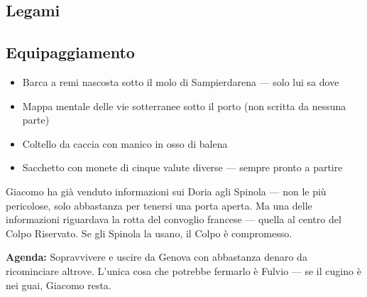 
\subsection*{Legami}

\subsection*{Equipaggiamento}
\begin{itemize}
  \item Barca a remi nascosta sotto il molo di Sampierdarena — solo lui sa dove
  \item Mappa mentale delle vie sotterranee sotto il porto (non scritta da nessuna parte)
  \item Coltello da caccia con manico in osso di balena
  \item Sacchetto con monete di cinque valute diverse — sempre pronto a partire
\end{itemize}

\begin{secretbox}
Giacomo ha già venduto informazioni sui Doria agli Spinola — non le più
pericolose, solo abbastanza per tenersi una porta aperta. Ma una delle
informazioni riguardava la rotta del convoglio francese — quella al centro
del Colpo Riservato. Se gli Spinola la usano, il Colpo è compromesso.

\medskip
\textbf{\textcolor{SecretRed}{Agenda:}} Sopravvivere e uscire da Genova con abbastanza denaro
da ricominciare altrove. L'unica cosa che potrebbe fermarlo è Fulvio —
se il cugino è nei guai, Giacomo resta.
\end{secretbox}

